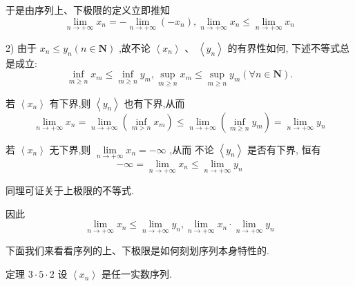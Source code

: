 于是由序列上、下极限的定义立即推知
$$\mathop{\lim }\limits_{{n \rightarrow   + \infty }}{x}_{n} =  - \mathop{\lim }\limits_{{n \rightarrow   + \infty }}\left( {-{x}_{n}}\right) ,\mathop{\lim }\limits_{{n \rightarrow   + \infty }}{x}_{n} \leq  \mathop{\lim }\limits_{{n \rightarrow   + \infty }}{x}_{n}$$

2) 由于 ${x}_{n} \leq  {y}_{n}\left( {n \in  \mathbf{N}}\right)$ ,故不论 $\left\langle  {x}_{n}\right\rangle  \text{ 、 }\left\langle  {y}_{n}\right\rangle$ 的有界性如何, 下述不等式总是成立:
$$\mathop{\inf }\limits_{{m \geq  n}}{x}_{m} \leq  \mathop{\inf }\limits_{{m \geq  n}}{y}_{m},\mathop{\sup }\limits_{{m \geq  n}}{x}_{m} \leq  \mathop{\sup }\limits_{{m \geq  n}}{y}_{m}\left( {\forall n \in  \mathbf{N}}\right) .$$

若 $\left\langle  {x}_{n}\right\rangle$ 有下界,则 $\left\langle  {y}_{n}\right\rangle$ 也有下界,从而
$$\mathop{\lim }\limits_{{n \rightarrow   + \infty }}{x}_{n} = \mathop{\lim }\limits_{{n \rightarrow   + \infty }}\left( {\mathop{\inf }\limits_{{m > n}}{x}_{m}}\right)  \leq  \mathop{\lim }\limits_{{n \rightarrow   + \infty }}\left( {\mathop{\inf }\limits_{{m \geq  n}}{y}_{m}}\right)  = \mathop{\lim }\limits_{{n \rightarrow   + \infty }}{y}_{n}$$

若 $\left\langle  {x}_{n}\right\rangle$ 无下界,则 $\mathop{\lim }\limits_{{n \rightarrow   + \infty }}{x}_{n} =  - \infty$ ,从而 不论 $\left\langle  {y}_{n}\right\rangle$ 是否有下界, 恒有
$$- \infty  = \mathop{\lim }\limits_{{n \rightarrow   + \infty }}{x}_{n} \leq  \mathop{\lim }\limits_{{n \rightarrow   + \infty }}{y}_{n}$$

同理可证关于上极限的不等式.

因此
$$\mathop{\lim }\limits_{{n \rightarrow   + \infty }}{x}_{n} \leq  \mathop{\lim }\limits_{{n \rightarrow   + \infty }}{y}_{n},\mathop{\lim }\limits_{{n \rightarrow   + \infty }}{x}_{n} \cdot  \mathop{\lim }\limits_{{n \rightarrow   + \infty }}{y}_{n}$$

下面我们来看看序列的上、下极限是如何刻划序列本身特性的.

定理 $3 \cdot  5 \cdot  2$ 设 $\left\langle  {x}_{n}\right\rangle$ 是任一实数序列.

